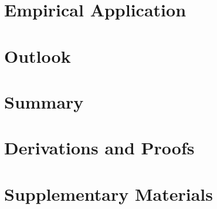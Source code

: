 \documentclass[a4paper,12pt,pagesize,DIV=calc,smallheadings,english]{article}
\begin{document}
\section{Empirical Application}
\label{sec:app}

\section{Outlook}
\label{sec:outl}

\section{Summary}
\label{sec:sum}

\appendix
\newpage
\section{Derivations and Proofs}
\label{app:deriv}

\newpage
\section{Supplementary Materials}
\label{app:deriv}

\newpage



\newpage
\nocite{*}
\printbibliography[heading=bibintoc] %
\end{document}
